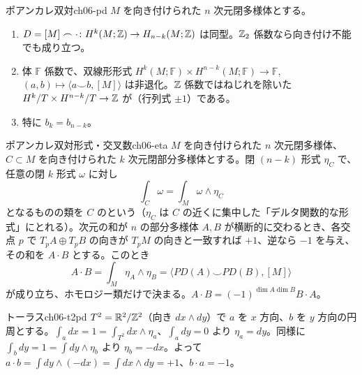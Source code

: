 \begin{mythm}{ポアンカレ双対}{ch06-pd}
$M$ を向き付けられた $n$ 次元閉多様体とする。
\begin{enumerate}
\item $D=[M]\frown\cdot\colon H^k(M;\mathbb{Z})\to H_{n-k}(M;\mathbb{Z})$ は同型。$\mathbb{Z}_2$ 係数なら向き付け不能でも成り立つ。
\item 体 $\mathbb F$ 係数で、双線形形式 $H^k(M;\mathbb F)\times H^{n-k}(M;\mathbb F)\to\mathbb F$, $(a,b)\mapsto\langle a\smile b,[M]\rangle$ は非退化。$\mathbb{Z}$ 係数ではねじれを除いた $H^k/T\times H^{n-k}/T\to\mathbb{Z}$ が（行列式 $\pm1$）である。
\item 特に $b_k=b_{n-k}$。
\end{enumerate}
\end{mythm}

\begin{mydef}{ポアンカレ双対形式・交叉数}{ch06-eta}
$M$ を向き付けられた $n$ 次元閉多様体、$C\subset M$ を向き付けられた $k$ 次元閉部分多様体とする。閉 $(n-k)$ 形式 $\eta_C$ で、任意の閉 $k$ 形式 $\omega$ に対し
\[
\int_C\omega=\int_M\omega\wedge\eta_C
\]
となるものの類を $C$ のという（$\eta_C$ は $C$ の近くに集中した「デルタ関数的な形式」にとれる）。次元の和が $n$ の部分多様体 $A,B$ が横断的に交わるとき、各交点 $p$ で $T_pA\oplus T_pB$ の向きが $T_pM$ の向きと一致すれば $+1$、逆なら $-1$ を与え、その和を $A\cdot B$ とする。このとき
\[
A\cdot B=\int_M\eta_A\wedge\eta_B=\langle PD(A)\smile PD(B),[M]\rangle
\]
が成り立ち、ホモロジー類だけで決まる。$A\cdot B=(-1)^{\dim A\dim B}B\cdot A$。
\end{mydef}
\begin{myex}{トーラス}{ch06-t2pd}
$T^2=\mathbb{R}^2/\mathbb{Z}^2$（向き $dx\wedge dy$）で $a$ を $x$ 方向、$b$ を $y$ 方向の円周とする。$\int_a dx=1=\int_{T^2}dx\wedge\eta_a$、$\int_a dy=0$ より $\eta_a=dy$。同様に $\int_b dy=1=\int dy\wedge\eta_b$ より $\eta_b=-dx$。よって $a\cdot b=\int dy\wedge(-dx)=\int dx\wedge dy=+1$、$b\cdot a=-1$。
\end{myex}

